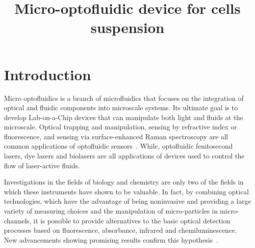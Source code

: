 \documentclass[sn-mathphys]{sn-jnl}
\theoremstyle{thmstyleone}%
\theoremstyle{thmstyletwo}%
\theoremstyle{thmstylethree}%
\begin{document}
\title[Micro-optofluidic device for cells suspension]{Micro-optofluidic device for cells suspension}


\author*[1]{ }


\author[1]{ }


\author[1]{ }


\author[1]{ }



\abstract{}


\maketitle

\section{Introduction}
Micro optofluidics is a branch of microfluidics that focuses on the integration of optical and fluidic components into microscale systems. Its ultimate goal is to develop Lab-on-a-Chip devices that can manipulate both light and fluids at the microscale. Optical trapping and manipulation, sensing by refractive index or fluorescence, and sensing via surface-enhanced Raman spectroscopy are all common applications of optofluidic sensors~\cite{2011-FanWhi}. While, optofluidic femtosecond lasers, dye lasers and biolasers are all applications of devices used to control the flow of laser-active fluids.   

Investigations in the fields of biology and chemistry are only two of the fields in which these instruments have shown to be valuable.
In fact, by combining optical technologies, which have the advantage of being noninvasive and providing a large variety of measuring choices and the manipulation of micro-particles in micro-channels, it is possible to provide alternatives to the basic optical detection processes based on fluorescence, absorbance, infrared and chemiluminescence. New advancements showing promising results confirm this hypothesis~\cite{2016-CaiGagCarRecBuc}.
\end{document}
